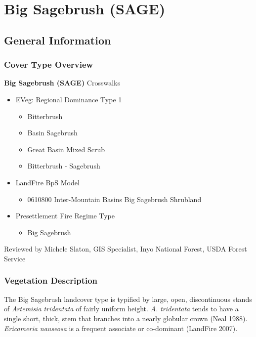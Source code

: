 
\section{Big Sagebrush (SAGE)}
\label{sage-description}

\subsection*{General Information}

\subsubsection{Cover Type Overview}

\textbf{Big Sagebrush (SAGE)}
\newline
Crosswalks
\begin{itemize}
	\item EVeg: Regional Dominance Type 1
	\begin{itemize}
		\item Bitterbrush 
		\item Basin Sagebrush
		\item Great Basin Mixed Scrub
		\item Bitterbrush - Sagebrush
	\end{itemize}

	\item LandFire BpS Model
	\begin{itemize}
		\item 0610800 Inter-Mountain Basins Big Sagebrush Shrubland
	\end{itemize}

	\item Presettlement Fire Regime Type
	\begin{itemize}
		\item Big Sagebrush
	\end{itemize}
\end{itemize}

\noindent Reviewed by Michele Slaton, GIS Specialist, Inyo National Forest, USDA Forest Service

\subsubsection{Vegetation Description}
The Big Sagebrush landcover type is typified by large, open, discontinuous stands of \emph{Artemisia tridentata} of fairly uniform height. \emph{A. tridentata} tends to have a single short, thick, stem that branches into a nearly globular crown (Neal 1988). \emph{Ericameria nauseosa} is a frequent associate or co-dominant (LandFire 2007).

